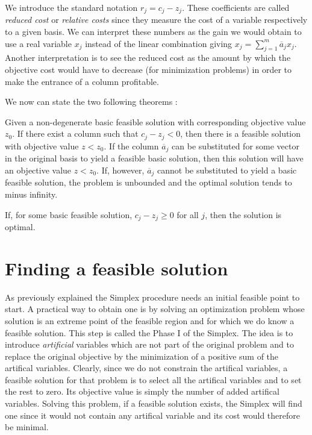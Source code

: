 We introduce the standard notation $r_j = c_j - z_j$. These coefficients are called \textit{reduced cost} or \textit{relative costs} since they measure the cost of a variable respectively to a given basis. We can interpret these numbers as the gain we would obtain to use a real variable $x_j$ instead of the linear combination giving $x_j = \sum_{j=1}^m \overline a_j x_j $. Another interpretation is to see the reduced cost as the amount by which the objective cost would have to decrease (for minimization problems) in order to make the entrance of a column profitable. 

We now can state the two following theorems : 
\begin{theorem}
    Given a non-degenerate basic feasible solution with corresponding objective value $z_0$. If there exist a column such that $c_j - z_j < 0$, then there is a feasible solution with objective value $z < z_0$. If the column $\overline a_j$ can be substituted for some vector in the original basis to yield a feasible basic solution, then this solution will have an objective value $z < z_0$. If, however, $\overline a_j$ cannot be substituted to yield a basic feasible solution, the problem is unbounded and the optimal solution tends to minus infinity. 
\end{theorem}
\begin{theorem}
    If, for some basic feasible solution, $c_j - z_j\ge 0$ for all $j$, then the solution is optimal. 
\end{theorem}

\section{Finding a feasible solution}

As previously explained the Simplex procedure needs an initial feasible point to start. A practical way to obtain one is by solving an optimization problem whose solution is an extreme point of the feasible region and for which we do know a feasible solution. This step is called the Phase I of the Simplex. The idea is to introduce \textit{artificial} variables which are not part of the original problem and to replace the original objective by the minimization of a positive sum of the artifical variables. Clearly, since we do not constrain the artifical variables, a feasible solution for that problem is to select all the artifical variables and to set the rest to zero. Its objective value is simply the number of added artifical variables. Solving this problem, if a feasible solution exists, the Simplex will find one since it would not contain any artifical variable and its cost would therefore be minimal. 

